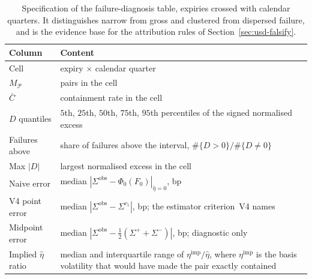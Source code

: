 \documentclass[../../../main.tex]{subfiles}
\begin{document}
\begin{table}[htbp]
\centering\small
\caption{Specification of the failure-diagnosis table, expiries crossed with calendar quarters. It distinguishes narrow from gross and clustered from dispersed failure, and is the evidence base for the attribution rules of Section~\ref{sec:usd-falsify}.}
\label{tab:usd-ident-excess}
\begin{tabular}{@{}ll@{}}
\toprule
Column & Content \\
\midrule
Cell & expiry $\times$ calendar quarter \\
$M_{\mathcal P}$ & pairs in the cell \\
$\bar C$ & containment rate in the cell \\
$D$ quantiles & $5$th, $25$th, $50$th, $75$th, $95$th percentiles of the signed normalised excess \\
Failures above & share of failures above the interval, $\#\{D>0\}/\#\{D\ne0\}$ \\
Max $|D|$ & largest normalised excess in the cell \\
Naive error & median $|\Sigma^{\mathrm{obs}}-\Phi_0(F_0)|_{\hat\eta=0}$, bp \\
V4 point error & median $|\Sigma^{\mathrm{obs}}-\Sigma^{v_1}|$, bp; the estimator criterion~V4 names \\
Midpoint error & median $|\Sigma^{\mathrm{obs}}-\tfrac12(\Sigma^++\Sigma^-)|$, bp; diagnostic only \\
Implied $\hat\eta$ ratio & median and interquartile range of $\eta^{\mathrm{imp}}/\hat\eta$, where $\eta^{\mathrm{imp}}$ is the basis volatility that would have made the pair exactly contained \\
\bottomrule
\end{tabular}
\end{table}
\end{document}
